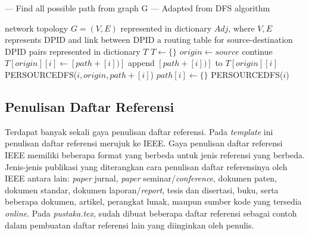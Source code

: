 \begin{algorithm}
\caption{--- Find all possible path from graph G --- Adapted from DFS algorithm}\label{alg1}
\begin{algorithmic}[1]
\Require network topology $G = (V,E)$ represented in dictionary $Adj$, where $V, E$ represents DPID and link between DPID
\Ensure a routing table for source-destination DPID pairs represented in dictionary $T$
\State $T \leftarrow \{\}$
    \State $origin \leftarrow source$
  \EndIf
      \State continue
    \Else
        \State $T[origin][i] \leftarrow [path + [i])]$
        \Else
          \State append $[path + [i])]$ to $T[origin][i]$
      \EndIf
      \State PER\textunderscore SOURCE\textunderscore DFS($i, origin, path + [i]$)
    \EndIf
  \EndFor
\EndProcedure
{}
  \State $path[i] \leftarrow \{\}$
  \State PER\textunderscore SOURCE\textunderscore DFS($i$)
\EndFor
\end{algorithmic}
\end{algorithm}

\subsection{Penulisan Daftar Referensi}
Terdapat banyak sekali gaya penulisan daftar referensi. Pada \textit{template} ini penulisan daftar referensi merujuk ke IEEE. Gaya penulisan daftar referensi IEEE \cite{ieee_style} memiliki beberapa format yang berbeda untuk jenis referensi yang berbeda. Jenis-jenis publikasi yang diterangkan cara penulisan daftar referensinya oleh IEEE antara lain: \textit{paper} jurnal, \textit{paper} seminar/\textit{conference}, dokumen paten, dokumen standar, dokumen laporan/\textit{report}, tesis dan disertasi, buku, serta beberapa dokumen, artikel, perangkat lunak, maupun sumber kode yang tersedia \textit{online}. Pada \textit{pustaka.tex}, sudah dibuat beberapa daftar referensi sebagai contoh dalam pembuatan daftar referensi lain yang diinginkan oleh penulis.
